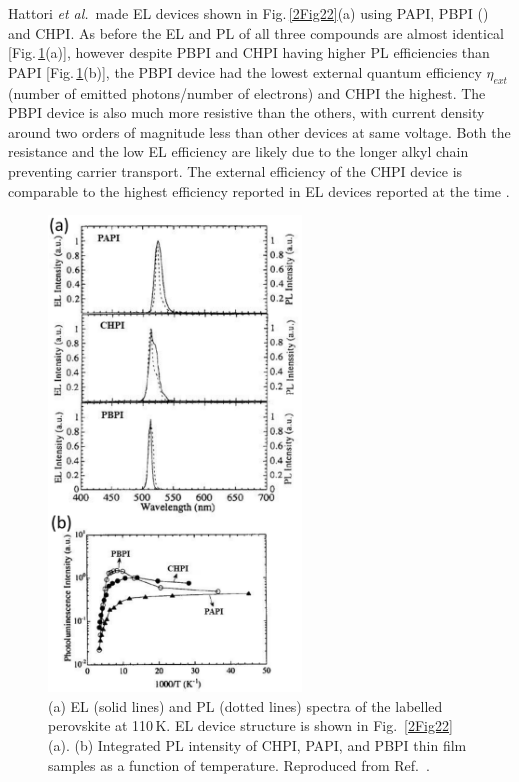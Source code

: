 Hattori \textit{et al.}\ made EL devices shown in Fig.\,\ref{2Fig22}(a) using PAPI, PBPI () and CHPI. As before the EL and PL of all three compounds are almost identical [Fig.\,\ref{2Fig23}(a)], however despite PBPI and CHPI having higher PL efficiencies than PAPI [Fig.\,\ref{2Fig23}(b)], the PBPI device had the lowest external quantum efficiency $\eta_{ext}$ (number of emitted photons/number of electrons) and CHPI the highest. The PBPI device is also much more resistive than the others, with current density around two orders of magnitude less than other devices at same voltage. Both the resistance and the low EL efficiency are likely due to the longer alkyl chain preventing carrier transport. The external efficiency of the CHPI device is comparable to the highest efficiency reported in EL devices reported at the time \cite{Hattori1996}.
\begin{figure}[h!]
\centering
\includegraphics[width=0.6\textwidth]{Fig23}
\caption{(a) EL (solid lines) and PL (dotted lines) spectra of the labelled perovskite at 110\,K. EL device structure is shown in Fig.\ \ref{2Fig22}(a). (b) Integrated PL intensity of CHPI, PAPI, and PBPI thin film samples as a function of temperature. Reproduced from Ref.\ \cite{Hattori1996}.}
\label{2Fig23}
\end{figure}

